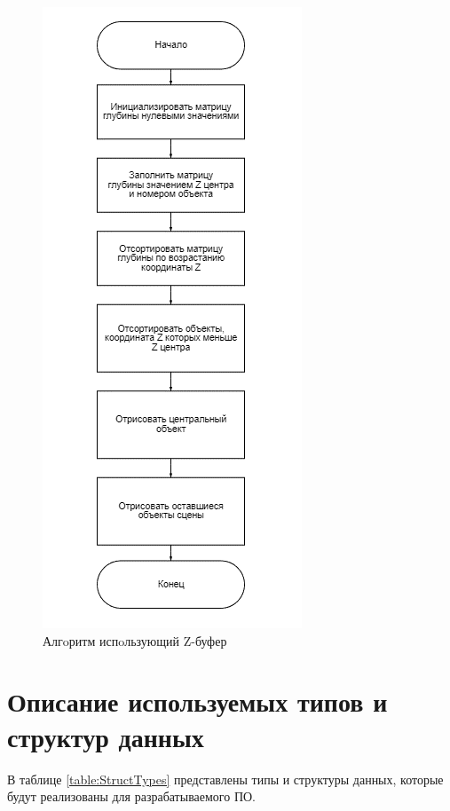 \begin{figure}[H]
	\begin{center}
		\includegraphics[scale=0.9]{img/zbuffer.png}
	\end{center}
	\captionsetup{justification=centering}
	\caption{Алгoритм испoльзующий Z-буфер}
	\label{img:buffer}
\end{figure}




\section{Описание используемых типов и структур данных}
    В таблице \ref{table:StructTypes} представлены типы и структуры данных, которые будут реализованы для разрабатываемого ПО.

